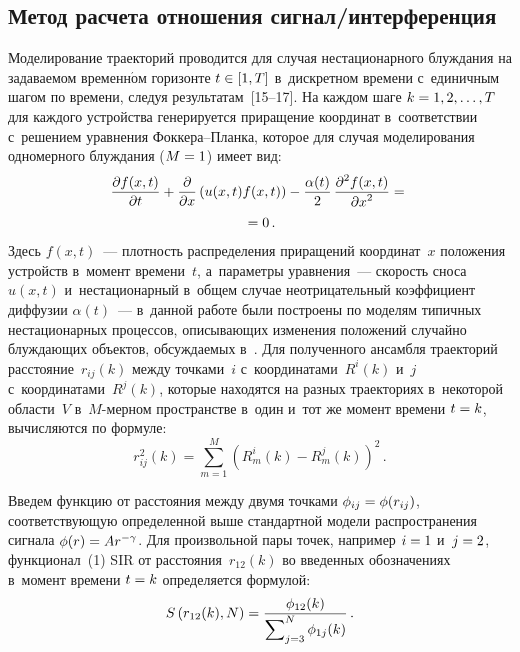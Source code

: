 \begin{multicols}{2}
\vspace*{-6pt}

\section{Метод расчета отношения сигнал/интерференция}

\vspace*{-2pt}

  Моделирование траекторий проводится для случая нестационарного 
блуждания на задаваемом временн$\acute{\mbox{о}}$м горизонте $t\hm\in [1,T]$ в~дискретном 
времени с~единичным шагом по времени, следуя результатам~[15--17]. На 
каждом шаге $k\hm=1,2,\ldots, T$ для каждого устройства генерируется 
приращение координат в~соответствии с~решением уравнения  
Фок\-ке\-ра--План\-ка, которое для случая моделирования одномерного 
блуждания ($M\hm=1$) имеет вид:
  \begin{multline}
  \displaystyle\frac{\displaystyle \partial f(x,t)\mathstrut}{\displaystyle \partial t\mathstrut} +\displaystyle\frac{\displaystyle \partial\mathstrut}{\displaystyle \partial x\mathstrut}\left( u(x,t)f(x,t)\right) -
\displaystyle\frac{\displaystyle \alpha(t)\mathstrut}{\displaystyle 2\mathstrut}\,\displaystyle\frac{\displaystyle \partial^2 f(x,t)\mathstrut}{\displaystyle \partial x^2\mathstrut}={}\\
{}=0\,.
  \label{e2-gai}
  \end{multline}
Здесь $f(x,t)$~--- плотность распределения приращений координат~$x$ 
положения устройств в~момент времени~$t$, а~параметры уравнения~--- 
скорость сноса $u(x,t)$ и~нестационарный в~общем случае неотрицательный 
коэффициент диффузии $\alpha(t)$~--- в~данной работе были построены по 
моделям типичных нестационарных процессов, описывающих изменения 
положений случайно блуждающих объектов, обсуждаемых в~\cite{17-gai}. Для 
полученного ансамбля траекторий расстояние~$r_{ij}(k)$ между точками~$i$ 
с~координатами~$R^i(k)$ и~$j$ с~координатами~$R^j(k)$, которые находятся 
на разных траекториях в~некоторой об\-ласти~$V$ в~$M$-мер\-ном пространстве 
в~один и~тот же момент времени $t\hm=k$, вычисляются по формуле:
$$
r_{ij}^2(k)= \sum\limits_{m=1}^M \left( R^i_m(k)-R_m^j(k)\right)^2\,.
  $$
  
  Введем функцию от расстояния между двумя точками $\phi_{ij}\hm= 
\phi(r_{ij})$, соответствующую определенной выше стандартной модели 
распространения сигнала $\phi(r)\hm= Ar^{-\gamma}$. Для произвольной пары 
точек, например $i\hm=1$ и~$j\hm=2$, функционал~(1) SIR от 
расстояния~$r_{12}(k)$ во введенных обозначениях в~момент времени 
$t\hm=k$ определяется формулой:
  \begin{equation}
  S\left( r_{12}(k),N\right) =\displaystyle\frac{\displaystyle \phi_{12}(k)\mathstrut}{\displaystyle \sum\nolimits_{j=3}^N 
\phi_{1j}(k)\mathstrut}\,.
  \label{e3-gai}
  \end{equation}
  

\end{multicols}
